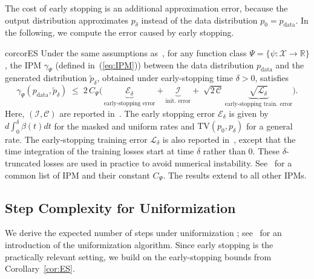 \documentclass{article} %
\def\eqref#1{equation~\ref{#1}}
\newcommand{\TV}{\mathrm{TV}}
\renewcommand{\eqref}[1]{\textup{(\ref{#1})}}
\begin{document}
The cost of early stopping is an additional approximation error, because the output distribution approximates $p_\delta$ instead of the data distribution $p_0 = p_\mathrm{data}$. In the following, we compute the error caused by early stopping.

\begin{restatable}{cor}{corES}\label{cor:ES}
Under the same assumptions as~, for any function class $\Psi= \{\psi: \mathcal{X} \to \mathbb{R} \}$, the IPM $\gamma_\Psi$ (defined in~\eqref{eq:IPM}) between the data distribution
$p_{\mathrm{data}}$ and the generated distribution $\tilde p_\delta$, obtained under early-stopping time $\delta>0$, satisfies 
\begin{equation}\label{eq:master_ES}
  \gamma_\Psi(p_{\mathrm{data}}, \tilde{p}_\delta)  \;\le\;2\, C_\Psi \Big(\,\underbrace{\mathcal{E}_\delta}_{\text{early-stopping error}} + \underbrace{\mathcal I}_{\text{init.\ error}}
  +\; \sqrt{2\,\mathcal C}\,\underbrace{\sqrt{\mathcal{L}_\delta}}_{\text{early-stopping train.\ error}}\Big).
\end{equation}
Here, $(\mathcal I,\mathcal C)$ are reported in~. The early stopping error $\mathcal{E}_\delta$ is given by $d\int_0^\delta \beta(t) dt$ for the masked and uniform rates and $\TV(p_0, p_\delta)$ for a general rate. The early-stopping training error $\mathcal{L}_\delta$ is also reported in~, except that the time integration of the training losses start at time $\delta$ rather than 0. These $\delta$-truncated losses are used in practice to avoid numerical instability. See~ for a common list of IPM and their constant $C_\Psi$. The results extend to all other IPMs.
\end{restatable}

\subsection{Step Complexity for Uniformization} 
We derive the expected number of steps under uniformization \citep{jensen1953markoff,grassmann1977transient,de2000transient}; see~\citep[Section~2]{chen2025convergence} for an introduction of the uniformization algorithm. Since early stopping is the practically relevant setting, we build on the early-stopping bounds from Corollary~\ref{cor:ES}.
\end{document}
